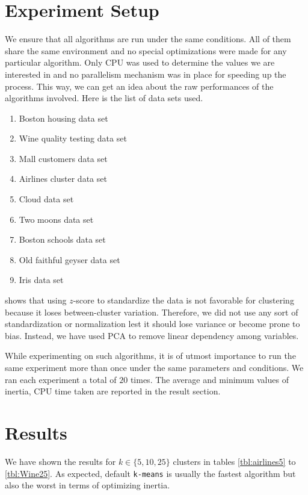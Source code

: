 \documentclass[12pt]{article}
\begin{document}
	\section{Experiment Setup}
	We ensure that all algorithms are run under the same conditions. All of them share the same environment and no special optimizations were made for any particular algorithm. Only CPU was used to determine the values we are interested in and no parallelism mechanism was in place for speeding up the process. This way, we can get an idea about the raw performances of the algorithms involved. Here is the list of data sets used.
		\begin{enumerate}[i]
			\item Boston housing data set
			\item Wine quality testing data set
			\item Mall customers data set
			\item Airlines cluster data set
			\item Cloud data set
			\item Two moons data set
			\item Boston schools data set
			\item Old faithful geyser data set
			\item Iris data set
		\end{enumerate}
	\textcite{milligan_cooper_1988} shows that using $z$-score to standardize the data is not favorable for clustering because it loses between-cluster variation. Therefore, we did not use any sort of standardization or normalization lest it should lose variance or become prone to bias. Instead, we have used PCA to remove linear dependency among variables.

	While experimenting on such algorithms, it is of utmost importance to run the same experiment more than once under the same parameters and conditions. We ran each experiment a total of $20$ times. The average and minimum values of inertia, CPU time taken are reported in the result section.
	\section{Results}\label{sec:results}
	We have shown the results for $k\in\{5,10,25\}$ clusters in tables \ref{tbl:airlines5} to \ref{tbl:Wine25}. As expected, default \texttt{k-means} is usually the fastest algorithm but also the worst in terms of optimizing inertia.
\end{document}
